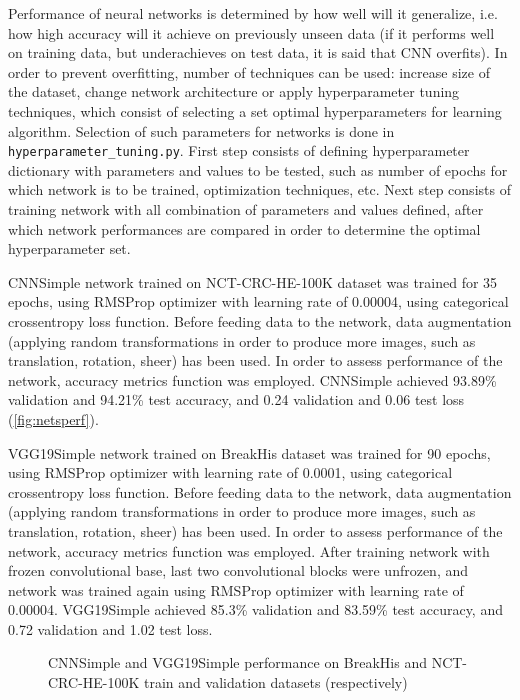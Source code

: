 Performance of neural networks is determined by how well will it generalize, i.e. how high accuracy will it achieve on previously unseen data (if it performs well on training data, but underachieves on test data, it is said that CNN overfits). In order to prevent overfitting, number of techniques can be used: increase size of the dataset, change network architecture or apply hyperparameter tuning techniques, which consist of selecting a set optimal hyperparameters for learning algorithm. Selection of such parameters for networks is done in \texttt{hyperparameter\_tuning.py}. First step consists of defining hyperparameter dictionary with parameters and values to be tested, such as number of epochs for which network is to be trained, optimization techniques, etc. Next step consists of training network with all combination of parameters and values defined, after which network performances are compared in order to determine the optimal hyperparameter set.

CNNSimple network trained on NCT-CRC-HE-100K dataset was trained for 35 epochs, using RMSProp optimizer with learning rate of 0.00004, using categorical crossentropy loss function. Before feeding data to the network, data augmentation (applying random transformations in order to produce more images, such as translation, rotation, sheer) has been used. In order to assess performance of the network, accuracy metrics function was employed. CNNSimple achieved 93.89\% validation and 94.21\% test accuracy, and 0.24 validation and 0.06 test loss (\textcolor{red}{\autoref{fig:netsperf}}).

VGG19Simple network trained on BreakHis dataset was trained for 90 epochs, using RMSProp optimizer with learning rate of 0.0001, using categorical crossentropy loss function. Before feeding data to the network, data augmentation (applying random transformations in order to produce more images, such as translation, rotation, sheer) has been used. In order to assess performance of the network, accuracy metrics function was employed. After training network with frozen convolutional base, last two convolutional blocks were unfrozen, and network was trained again using RMSProp optimizer with learning rate of 0.00004. VGG19Simple achieved 85.3\% validation and 83.59\% test accuracy, and 0.72 validation and 1.02 test loss.

\begin{figure}[h]
	\centering
	\caption{CNNSimple and VGG19Simple performance on BreakHis and NCT-CRC-HE-100K train and validation datasets (respectively)}
	\label{fig:netsperf}
\end{figure}

